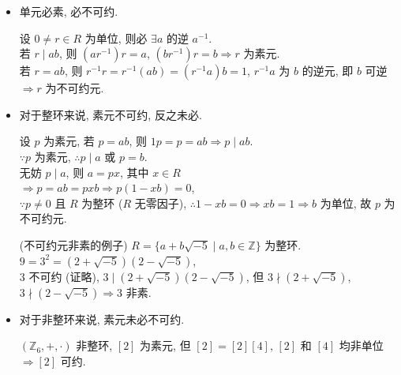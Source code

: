 \documentclass{note}
\begin{document}
\begin{itemize}
    \item 单元必素, 必不可约.
    \begin{pf}
        设 $0\neq r\in R$ 为单位, 则必 $\exists a$ 的逆 $a^{-1}$.\\
        若 $r\mid ab$, 则 $(ar^{-1})r=a$, $(br^{-1})r=b\Longrightarrow r$ 为素元.\\
        若 $r=ab$, 则 $r^{-1}r=r^{-1}(ab)=(r^{-1}a)b=1$, $r^{-1}a$ 为 $b$ 的逆元, 即 $b$ 可逆 $\Longrightarrow r$ 为不可约元.
    \end{pf}
    \item 对于整环来说, 素元不可约, 反之未必.
    \begin{pf}
        设 $p$ 为素元, 若 $p=ab$, 则 $1p=p=ab\Longrightarrow p\mid ab$.\\
        $\because p$ 为素元, $\therefore p\mid a$ 或 $p=b$.\\
        无妨 $p\mid a$, 则 $a=px$, 其中 $x\in R$\\
        $\Longrightarrow p=ab=pxb\Longrightarrow p(1-xb)=0$,\\
        $\because p\neq 0$ 且 $R$ 为整环 ($R$ 无零因子), $\therefore 1-xb=0\Longrightarrow xb=1\Longrightarrow b$ 为单位, 故 $p$ 为不可约元.
    \end{pf}
    \begin{eg}(不可约元非素的例子)
        $R=\{a+b\sqrt{-5}\mid a,b\in\mathbb{Z}\}$ 为整环.\\
        $9=3^2=(2+\sqrt{-5})(2-\sqrt{-5})$,\\
        $3$ 不可约 (证略), $3\mid(2+\sqrt{-5})(2-\sqrt{-5})$, 但 $3\nmid(2+\sqrt{-5})$, $3\nmid(2-\sqrt{-5})\Longrightarrow 3$ 非素.
    \end{eg}
    \item 对于非整环来说, 素元未必不可约.
    \begin{eg}
        $(\mathbb{Z}_6,+,\cdot)$ 非整环, $[2]$ 为素元, 但 $[2]=[2][4]$, $[2]$ 和 $[4]$ 均非单位 $\Longrightarrow[2]$ 可约.
    \end{eg}
\end{itemize}
\end{document}
